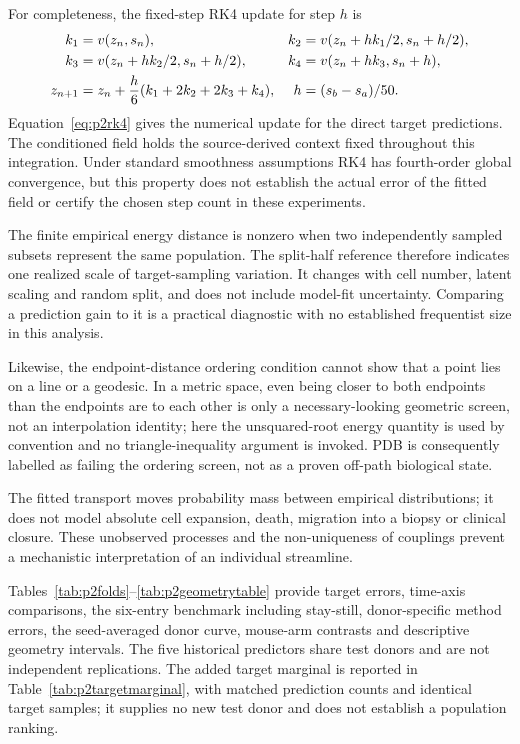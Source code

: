 \documentclass[10pt,a4paper]{article}
\begin{document}
For completeness, the fixed-step RK4 update for step $h$ is
\begin{align}
k_1&=v(z_n,s_n),& k_2&=v(z_n+hk_1/2,s_n+h/2),\notag\\
k_3&=v(z_n+hk_2/2,s_n+h/2),& k_4&=v(z_n+hk_3,s_n+h),\notag\\
z_{n+1}&=z_n+\frac h6(k_1+2k_2+2k_3+k_4),&h&=(s_b-s_a)/50.\label{eq:p2rk4}
\end{align}
Equation~\eqref{eq:p2rk4} gives the numerical update for the direct target predictions. The conditioned field holds the source-derived context fixed throughout this integration. Under standard smoothness assumptions RK4 has fourth-order global convergence, but this property does not establish the actual error of the fitted field or certify the chosen step count in these experiments.

The finite empirical energy distance is nonzero when two independently sampled subsets represent the same population. The split-half reference therefore indicates one realized scale of target-sampling variation. It changes with cell number, latent scaling and random split, and does not include model-fit uncertainty. Comparing a prediction gain to it is a practical diagnostic with no established frequentist size in this analysis.

Likewise, the endpoint-distance ordering condition cannot show that a point lies on a line or a geodesic. In a metric space, even being closer to both endpoints than the endpoints are to each other is only a necessary-looking geometric screen, not an interpolation identity; here the unsquared-root energy quantity is used by convention and no triangle-inequality argument is invoked. PDB is consequently labelled as failing the ordering screen, not as a proven off-path biological state.

The fitted transport moves probability mass between empirical distributions; it does not model absolute cell expansion, death, migration into a biopsy or clinical closure. These unobserved processes and the non-uniqueness of couplings prevent a mechanistic interpretation of an individual streamline.

Tables~\ref{tab:p2folds}--\ref{tab:p2geometrytable} provide target errors, time-axis comparisons, the six-entry benchmark including stay-still, donor-specific method errors, the seed-averaged donor curve, mouse-arm contrasts and descriptive geometry intervals. The five historical predictors share test donors and are not independent replications. The added target marginal is reported in Table~\ref{tab:p2targetmarginal}, with matched prediction counts and identical target samples; it supplies no new test donor and does not establish a population ranking.
\end{document}

